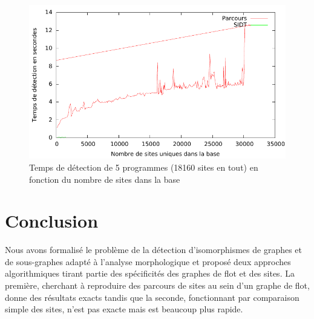 \begin{figure}[h]
\begin{center}
\includegraphics{supports/plots/plotScan.pdf}
\end{center}
\caption{Temps de détection de 5 programmes (18160 sites en tout) en fonction du nombre de sites dans la base}
\label{fig:scan}
\end{figure}




\section{Conclusion}
Nous avons formalisé le problème de la détection d'isomorphismes de graphes et de sous-graphes adapté à l'analyse morphologique et proposé deux approches algorithmiques tirant partie des spécificités des graphes de flot et des sites.
La première, cherchant à reproduire des parcours de sites au sein d'un graphe de flot, donne des résultats exacts tandis que la seconde, fonctionnant par comparaison simple des sites, n'est pas exacte mais est beaucoup plus rapide.

